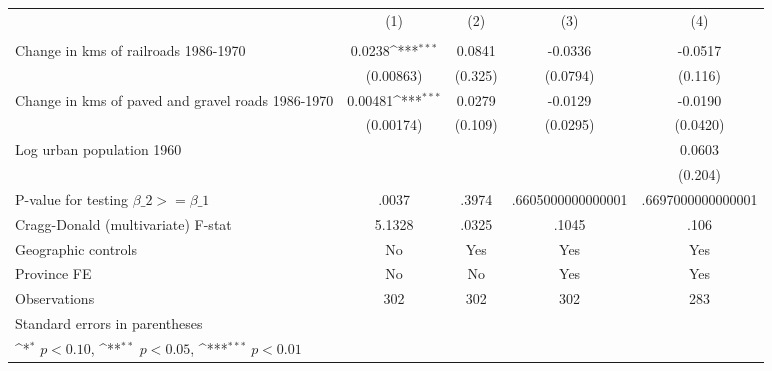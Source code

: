 {
\def\sym#1{\ifmmode^{#1}\else\(^{#1}\)\fi}
\begin{tabular}{l*{4}{c}}
\hline\hline
                &\multicolumn{1}{c}{(1)}&\multicolumn{1}{c}{(2)}&\multicolumn{1}{c}{(3)}&\multicolumn{1}{c}{(4)}\\
                &\multicolumn{1}{c}{}&\multicolumn{1}{c}{}&\multicolumn{1}{c}{}&\multicolumn{1}{c}{}\\
\hline
Change in kms of railroads 1986-1970&   0.0238\sym{***}&   0.0841         &  -0.0336         &  -0.0517         \\
                &(0.00863)         &  (0.325)         & (0.0794)         &  (0.116)         \\
[1em]
Change in kms of paved and gravel roads 1986-1970&  0.00481\sym{***}&   0.0279         &  -0.0129         &  -0.0190         \\
                &(0.00174)         &  (0.109)         & (0.0295)         & (0.0420)         \\
[1em]
Log urban population 1960&                  &                  &                  &   0.0603         \\
                &                  &                  &                  &  (0.204)         \\
\hline
P-value for testing $\beta\_{2} >= \beta\_{1}$&    .0037         &    .3974         &.6605000000000001         &.6697000000000001         \\
Cragg-Donald (multivariate) F-stat&   5.1328         &    .0325         &    .1045         &     .106         \\
Geographic controls&       No         &      Yes         &      Yes         &      Yes         \\
Province FE     &       No         &       No         &      Yes         &      Yes         \\
Observations    &      302         &      302         &      302         &      283         \\
\hline\hline
\multicolumn{5}{l}{\footnotesize Standard errors in parentheses}\\
\multicolumn{5}{l}{\footnotesize \sym{*} \(p<0.10\), \sym{**} \(p<0.05\), \sym{***} \(p<0.01\)}\\
\end{tabular}
}
